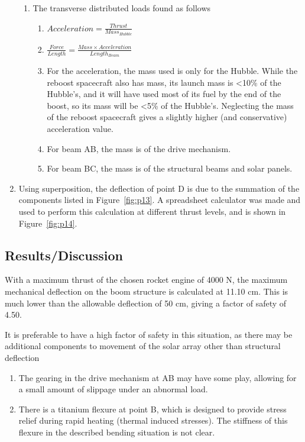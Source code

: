 \documentclass[paper=letter, fontsize=11pt]{scrartcl} %
\numberwithin{equation}{section} %
\numberwithin{figure}{section} %
\numberwithin{table}{section} %
\begin{document}
\begin{enumerate}
\begin{enumerate}
\item The transverse distributed loads found as follows
\begin{enumerate}
\item $Acceleration = \frac{Thrust}{Mass_{Hubble}}$
\item $\frac{Force}{Length} = \frac{Mass \times Acceleration}{Length_{Beam}}$
\item For the acceleration, the mass used is only for the Hubble. While the reboost spacecraft also has mass, its launch mass is \textless 10\% of the Hubble's, and it will have used most of its fuel by the end of the boost, so its mass will be \textless 5\% of the Hubble's. Neglecting the mass of the reboost spacecraft gives a slightly higher (and conservative) acceleration value.
\item For beam AB, the mass is of the drive mechanism.
\item For beam BC, the mass is of the structural beams and solar panels.
\end{enumerate}
\end{enumerate}
\item Using superposition, the deflection of point D is due to the summation of the components listed in Figure~\ref{fig:p13}. A spreadsheet calculator was made and used to perform this calculation at different thrust levels, and is shown in Figure~\ref{fig:p14}.
\end{enumerate}

\subsection{Results/Discussion}
With a maximum thrust of the chosen rocket engine of 4000 N, the maximum mechanical deflection on the boom structure is calculated at 11.10 cm. This is much lower than the allowable deflection of 50 cm, giving a factor of safety of 4.50.

It is preferable to have a high factor of safety in this situation, as there may be additional components to movement of the solar array other than structural deflection
\begin{enumerate}
\item The gearing in the drive mechanism at AB may have some play, allowing for a small amount of slippage under an abnormal load.
\item There is a titanium flexure at point B, which is designed to provide stress relief during rapid heating (thermal induced stresses). The stiffness of this flexure in the described bending situation is not clear.
\end{enumerate}
\end{document}
